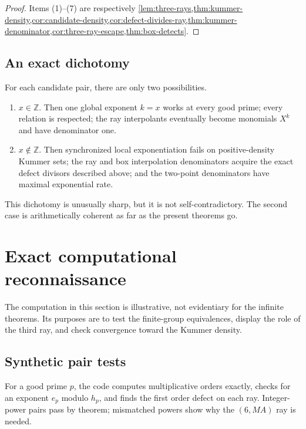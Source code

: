 \documentclass[11pt]{article}
\theoremstyle{definition}
\newcommand{\Z}{\mathbb Z}
\begin{document}
\begin{proof}
Items (1)--(7) are respectively
\cref{lem:three-rays,thm:kummer-density,cor:candidate-density,cor:defect-divides-ray,thm:kummer-denominator,cor:three-ray-escape,thm:box-detects}.
\end{proof}

\subsection{An exact dichotomy}

For each candidate pair, there are only two possibilities.

\begin{enumerate}[label=\textbf{Case \Alph*.},leftmargin=2.2cm]
\item $x\in\Z$.  Then one global exponent $k=x$ works at every good prime; every relation is
respected; the ray interpolants eventually become monomials $X^k$ and have denominator one.
\item $x\notin\Z$.  Then synchronized local exponentiation fails on positive-density Kummer
sets; the ray and box interpolation denominators acquire the exact defect divisors described
above; and the two-point denominators have maximal exponential rate.
\end{enumerate}

This dichotomy is unusually sharp, but it is not self-contradictory.  The second case is
arithmetically coherent as far as the present theorems go.

\section{Exact computational reconnaissance}
\label{sec:computation}

The computation in this section is illustrative, not evidentiary for the infinite theorems.
Its purposes are to test the finite-group equivalences, display the role of the third ray, and
check convergence toward the Kummer density.

\subsection{Synthetic pair tests}

For a good prime $p$, the code computes multiplicative orders exactly, checks for an exponent
$e_p$ modulo $h_p$, and finds the first order defect on each ray.  Integer-power pairs pass by
theorem; mismatched powers show why the $(6,MA)$ ray is needed.
\end{document}
